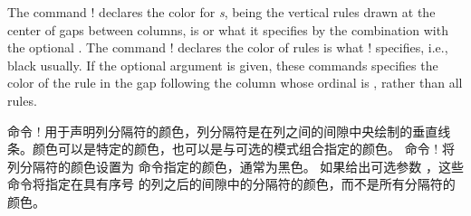 \begin{description}
The command \!\colseprulecolor! declares the color for
{\em\Uidx\cseprule{}s}, being the vertical rules drawn at the center of
gaps between columns, is  or what it specifies by the
combination with the optional .  The command
\!\normalcolseprulecolor! declares the color of rules is what
\!\normalcolor! specifies, i.e., black usually.  If the optional argument
 is given, these commands specifies the color of the rule in the
gap following the column whose ordinal is , rather than all rules.

命令 \!\colseprulecolor! 用于声明列分隔符的颜色，列分隔符是在列之间的间隙中央绘制的垂直线条。颜色可以是特定的颜色，也可以是与可选的模式组合指定的颜色。
命令 \!\normalcolseprulecolor! 将列分隔符的颜色设置为 \normalcolor 命令指定的颜色，通常为黑色。
如果给出可选参数 ，这些命令将指定在具有序号  的列之后的间隙中的分隔符的颜色，而不是所有分隔符的颜色。
\end{description}

